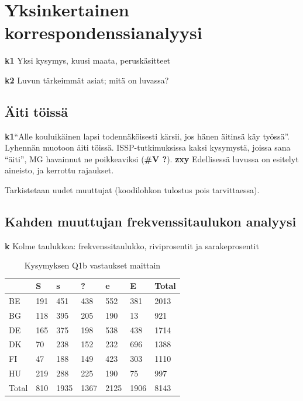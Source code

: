 \documentclass[
  finnish,
]{book}
\begin{document}
\hypertarget{yksinkertainen-korrespondenssianalyysi}{%
\chapter{Yksinkertainen korrespondenssianalyysi}\label{yksinkertainen-korrespondenssianalyysi}}

\textbf{k1} Yksi kysymys, kuusi maata, peruskäsitteet

\textbf{k2} Luvun tärkeimmät asiat; mitä on luvassa?

\hypertarget{uxe4iti-tuxf6issuxe4}{%
\section{Äiti töissä}\label{uxe4iti-tuxf6issuxe4}}

\textbf{k1}``Alle kouluikäinen lapsi todennäköisesti kärsii, jos hänen äitinsä käy työssä''.
Lyhennän muotoon äiti töissä. ISSP-tutkimuksissa kaksi kysymystä, joissa sana ``äiti'',
MG havainnut ne poikkeaviksi (\textbf{\#V ?}).
\textbf{zxy} Edellisessä luvussa on esitelyt aineisto, ja kerrottu rajaukset.

Tarkistetaan uudet muuttujat (koodilohkon tulostus pois tarvittaessa).

\hypertarget{kahden-muuttujan-frekvenssitaulukon-analyysi}{%
\section{Kahden muuttujan frekvenssitaulukon analyysi}\label{kahden-muuttujan-frekvenssitaulukon-analyysi}}

\textbf{k} Kolme taulukkoa: frekvenssitaulukko, riviprosentit ja sarakeprosentit

\begin{table}

\caption{\label{tab:simpeCA-frekTa1}Kysymyksen Q1b vastaukset maittain}
\centering
\begin{tabular}[t]{lllllll}
\toprule
  & S & s & ? & e & E & Total\\
\midrule
BE & 191 & 451 & 438 & 552 & 381 & 2013\\
BG & 118 & 395 & 205 & 190 & 13 & 921\\
DE & 165 & 375 & 198 & 538 & 438 & 1714\\
DK & 70 & 238 & 152 & 232 & 696 & 1388\\
FI & 47 & 188 & 149 & 423 & 303 & 1110\\
\addlinespace
HU & 219 & 288 & 225 & 190 & 75 & 997\\
Total & 810 & 1935 & 1367 & 2125 & 1906 & 8143\\
\bottomrule
\end{tabular}
\end{table}
\end{document}
